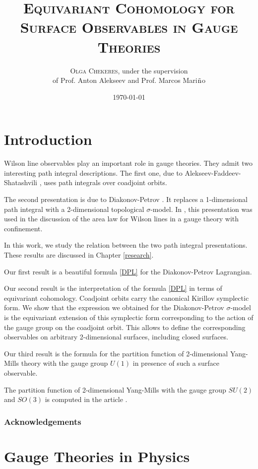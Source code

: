 \documentclass[11pt]{report}
\title{\textsc{Equivariant Cohomology for Surface Observables in Gauge Theories}}
\author{\textsc{Olga Chekeres}, under the supervision \\
of Prof. Anton Alekseev and Prof. Marcos Mari${\rm\tilde{n}}$o}
\date{\today}
\theoremstyle{plain}
\theoremstyle{definition}
\theoremstyle{remark}
\theoremstyle{remark}
\numberwithin{equation}{section}
\begin{document}
\maketitle
\tableofcontents

\chapter{Introduction}

   
   Wilson line observables play an important role in gauge theories. They admit two interesting path integral descriptions. The first one, due to Alekseev-Faddeev-Shatashvili \cite{AFS}, uses path integrals over coadjoint orbits. 

The second presentation is due to Diakonov-Petrov \cite{DP}. It replaces a 1-dimensional path integral with a 2-dimensional topological $\sigma$-model. 
In \cite{DP}, this presentation was used in the discussion of the area law for Wilson lines in a gauge theory with confinement.

In this work, we study the relation between the two path integral presentations. These results are discussed in Chapter \ref{research}.

Our first result is a beautiful formula \eqref{DPL} for the 
Diakonov-Petrov Lagrangian. 

Our second result is the interpretation of the formula \eqref{DPL} in terms of equivariant cohomology. 
Coadjoint orbits carry the canonical Kirillov symplectic form. We show that the expression we obtained for the Diakonov-Petrov $\sigma$-model 
is the equivariant extension of this symplectic form corresponding to the action of the gauge group on the coadjoint orbit. This allows to define the corresponding observables on arbitrary 2-dimensional surfaces, including closed surfaces.

Our third result is the formula for the partition function of 2-dimensional Yang-Mills theory with the gauge group $U(1)$ in presence of such a surface observable. 

The partition function of 2-dimensional Yang-Mills with the gauge group $SU(2)$ and $SO(3)$ is computed in the article \cite{ACM}.



\subsection*{Acknowledgements}



\chapter{Gauge Theories in Physics}
\end{document}
